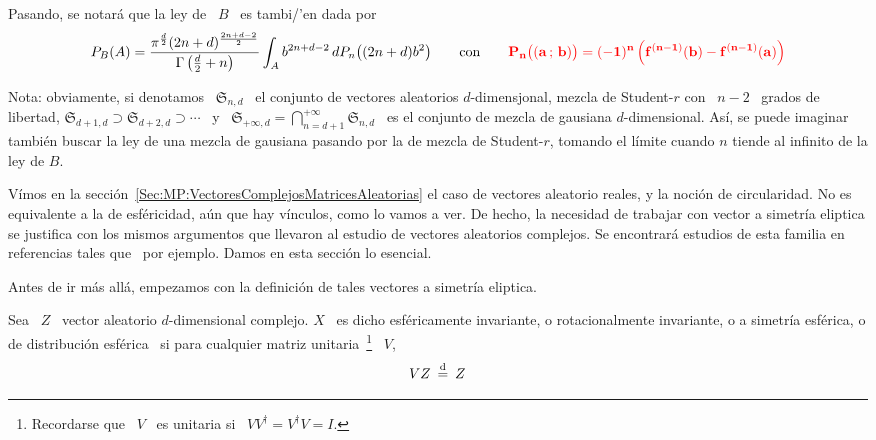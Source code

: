 Pasando, se notar\'a que la ley de \ $B$ \ es tambi/'en dada por
%
\[
P_B(A) = \frac{\pi^{\frac{d}{2}} (2 n + d)^{\frac{2 n + d - 2}{2}}}{\Gamma\left(
    \frac{d}{2} + n \right)}  \int_A b^{2 n + d - 2} \, dP_n\big(  (2 n + d) b^2
\big)  \qquad \mbox{con}  \qquad {\color{red}\bf P_n\big(  (a \, ; \,  b) \big)  =  (-1)^n \left(
    f^{(n-1)}(b) - f^{(n-1)}(a) \right)}
\]


Nota: obviamente, si denotamos \  $\mathfrak{S}_{n,d}$ \ el conjunto de vectores
aleatorios  $d$-dimensjonal, mezcla  de  Student-$r$  con \  $n-2$  \ grados  de
libertad, $\mathfrak{S}_{d+1,d} \supset \mathfrak{S}_{d+2,d} \supset \cdots$ \ y
\    $\displaystyle    \mathfrak{S}_{+\infty,d}   =    \bigcap_{n=d+1}^{+\infty}
\mathfrak{S}_{n,d}$    \    es   el    conjunto    de    mezcla   de    gausiana
$d$-dimensional. As\'i, se puede imaginar  tambi\'en buscar la ley de una mezcla
de gausiana pasando por la de  mezcla de Student-$r$, tomando el l\'imite cuando
$n$ tiende al infinito de la ley de $B$.



\label{Ssec:MP:FamiliaElipticaCompleja}

V\'imos en la secci\'on~\ref{Sec:MP:VectoresComplejosMatricesAleatorias} el caso
de vectores aleatorio reales, y la noci\'on de circularidad. No es equivalente a
la de esf\'ericidad, a\'un  que hay v\'inculos, como lo vamos a  ver. De hecho, la
necesidad  de trabajar con  vector a  simetr\'ia eliptica  se justifica  con los
mismos argumentos que  llevaron al estudio de vectores  aleatorios complejos. Se
encontrar\'a estudios  de esta familia en  referencias tales que~\cite{KriLin86,
  MicDey06, OllTyl12, FanKot90, BesAbr13, BauPas07, ChiPas08} por ejemplo. Damos
en esta secci\'on lo esencial.

Antes de  ir m\'as  all\'a, empezamos  con la definici\'on  de tales  vectores a
simetr\'ia eliptica.
%
\begin{definicion}
  Sea  \  $Z$ \  vector  aleatorio $d$-dimensional  complejo.   $X$  \ es  dicho
  esf\'ericamente  invariante,  o   rotacionalmente  invariante,  o  a  simetr\'ia
  esf\'erica,   o  de  distribuci\'on   esf\'erica  \   si  para   cualquier  matriz
  unitaria~\footnote{Recordarse que \ $V$ \ es  unitaria si \ $V V^\dag = V^\dag
    V = I$.} \ $V$,
  \[
  V  Z  \: \stackrel{\mathrm{d}}{=}  \: Z
  \]
\end{definicion}

